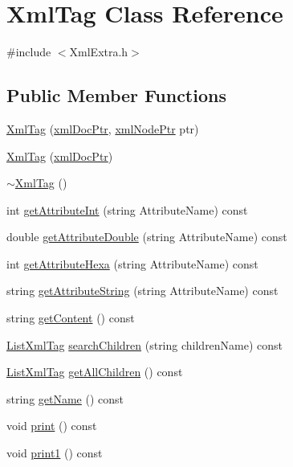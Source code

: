 \hypertarget{classXmlTag}{}\section{Xml\+Tag Class Reference}
\label{classXmlTag}


{\ttfamily \#include $<$Xml\+Extra.\+h$>$}

\subsection*{Public Member Functions}
\begin{DoxyCompactItemize}
\item 
\hyperlink{classXmlTag_af160832d5881c3d1fdeb173dd5278925}{Xml\+Tag} (\hyperlink{XmlExtra_8h_a5956a7913c28011b6a948fbe62075f56}{xml\+Doc\+Ptr}, \hyperlink{XmlExtra_8h_a4ad4a6885d35984ee31738a688402096}{xml\+Node\+Ptr} ptr)
\item 
\hyperlink{classXmlTag_a9413177ebf22e741d1d1cb14707bff63}{Xml\+Tag} (\hyperlink{XmlExtra_8h_a5956a7913c28011b6a948fbe62075f56}{xml\+Doc\+Ptr})
\item 
\hyperlink{classXmlTag_abbb5fef8e3d0dc433a6aaaf88a821d2f}{$\sim$\+Xml\+Tag} ()
\item 
int \hyperlink{classXmlTag_aad4c7b8e57cc6d6162338693c5f50721}{get\+Attribute\+Int} (string Attribute\+Name) const
\item 
double \hyperlink{classXmlTag_a24fd3594f3ec5f2391f1f3c75a0ddbfd}{get\+Attribute\+Double} (string Attribute\+Name) const
\item 
int \hyperlink{classXmlTag_a311499d078b772530223c6f2ebbf6857}{get\+Attribute\+Hexa} (string Attribute\+Name) const
\item 
string \hyperlink{classXmlTag_af17526426288613884f5f028c18d5b73}{get\+Attribute\+String} (string Attribute\+Name) const
\item 
string \hyperlink{classXmlTag_a0a6f6d258cff2682c36260f448d63ab3}{get\+Content} () const
\item 
\hyperlink{XmlExtra_8h_ade6a1aa0dc76b2c26a120f5c2f10ff7d}{List\+Xml\+Tag} \hyperlink{classXmlTag_a9aad053ee1d3cda7ce2cb76eb61b406a}{search\+Children} (string children\+Name) const
\item 
\hyperlink{XmlExtra_8h_ade6a1aa0dc76b2c26a120f5c2f10ff7d}{List\+Xml\+Tag} \hyperlink{classXmlTag_a7ef12656343543108cae06ceb94fc0ab}{get\+All\+Children} () const
\item 
string \hyperlink{classXmlTag_a75a408a38dc1e24965b64bf46a23f57f}{get\+Name} () const
\item 
void \hyperlink{classXmlTag_a75522d91e1514e5180d66341dd92f4af}{print} () const
\item 
void \hyperlink{classXmlTag_a240d1daa84c853ca638208ee26cd6842}{print1} () const
\end{DoxyCompactItemize}


